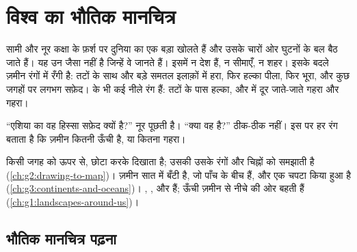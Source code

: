 \chapter{विश्व का भौतिक मानचित्र}\label{ch:g4:world-physical-map}

सामी और नूर कक्षा के फ़र्श पर दुनिया का एक बड़ा  खोलते हैं और उसके
चारों ओर घुटनों के बल बैठ जाते हैं। यह उन  जैसा नहीं है जिन्हें वे
जानते हैं। इसमें न देश हैं, न सीमाएँ, न शहर। इसके बदले ज़मीन रंगों में रँगी है:
तटों के साथ और बड़े समतल इलाक़ों में हरा, फिर हल्का पीला, फिर भूरा, और कुछ
जगहों पर लगभग सफ़ेद।  के भी कई नीले रंग हैं: तटों के पास हल्का, और
 में दूर जाते-जाते गहरा और गहरा।

``एशिया का वह हिस्सा सफ़ेद क्यों है?'' नूर पूछती है। ``क्या वह  है?'' ठीक-ठीक
नहीं। इस  पर हर रंग बताता है कि ज़मीन कितनी ऊँची है, या  कितना गहरा।

\begin{recall}
 किसी जगह को ऊपर से, छोटा करके दिखाता है; उसकी  उसके रंगों और
चिह्नों को समझाती है (\cref{ch:g2:drawing-to-map})। ज़मीन सात  में बँटी
है, जो पाँच  के बीच हैं, और  एक चपटा किया हुआ  है
(\cref{ch:g3:continents-and-oceans})। , ,  और  
हैं;  ऊँची ज़मीन से नीचे  की ओर बहती हैं
(\cref{ch:g1:landscapes-around-us})।
\end{recall}

\section{भौतिक मानचित्र पढ़ना}

